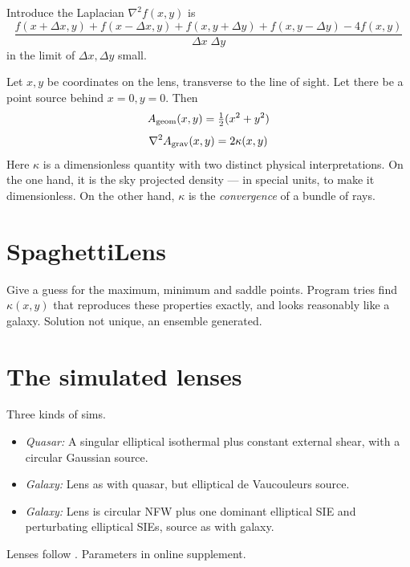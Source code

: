 \documentclass[12pt,preprint]{aastex}
\def\half{{\textstyle\frac12}}
\begin{document}
Introduce the Laplacian $\nabla^2 f(x,y)$ is
\begin{equation}
 \frac{ f(x+\Delta x, y) + f(x-\Delta x, y) +
        f(x, y+\Delta y) + f(x, y-\Delta y) - 4 f(x,y) }
      {\Delta x \; \Delta y}
\end{equation}
in the limit of $\Delta x,\Delta y$ small.

Let $x,y$ be coordinates on the lens, transverse to the line of sight.
Let there be a point source behind $x=0,y=0$.  Then
\begin{equation}
A_{\rm geom}(x,y) = \half(x^2 + y^2)
\end{equation}
\begin{equation}
\nabla^2 A_{\rm grav}(x,y) = 2\kappa(x,y)
\end{equation}
Here $\kappa$ is a dimensionless quantity with two distinct physical
interpretations.  On the one hand, it is the sky projected density ---
in special units, to make it dimensionless.  On the other hand,
$\kappa$ is the {\em convergence\/} of a bundle of rays.

\section{SpaghettiLens} \label{sec:SpaghettiLens}

Give a guess for the maximum, minimum and saddle points.  Program
tries find $\kappa(x,y)$ that reproduces these properties exactly, and
looks reasonably like a galaxy.  Solution not unique, an ensemble
generated.

\section{The simulated lenses} \label{sec:sims}

Three kinds of sims.

\begin{itemize}
\item {\em Quasar:\/} A singular elliptical isothermal plus constant
  external shear, with a circular Gaussian source.
\item {\em Galaxy:\/} Lens as with quasar, but elliptical de
  Vaucouleurs source.
\item {\em Galaxy:\/} Lens is circular NFW plus one dominant
  elliptical SIE and perturbating elliptical SIEs, source as with
  galaxy.
\end{itemize}
Lenses follow \cite{2001astro.ph..2341K,2001astro.ph..2340K}.
Parameters in online supplement.
\end{document}
